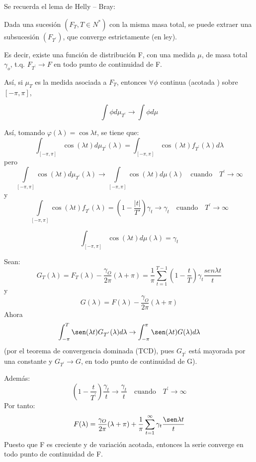 Se recuerda el lema de Helly -- Bray:\newline

Dada una sucesi\'{o}n $\left( {F_{T} ,T\in N^{\ast }} \right)$ con la misma masa total, se puede extraer una subsucesi\'{o}n $\left( F_{T^{'}} \right)$, que converge estrictamente (en ley).\newline

Es decir, existe una funci\'{o}n de distribuci\'{o}n F, con una medida $\mu $, de masa total $\gamma_{o}$, t.q. $F_{T^{'}} \to F$ en todo punto de continuidad de F.\newline

As\'{i}, si $\mu_{T}$ es la medida asociada a $F_{T}$, entonces $\forall \phi$ continua (acotada ) sobre $\left[ {-\pi ,\pi } \right]$, 

\[\int \phi d\mu_{T^{'}} \to \int \phi d\mu \]

As\'{i}, tomando $\varphi \left( \lambda \right)=\cos \lambda t$, se tiene que:
\[
\int_{\left[-\pi,\pi \right]} \cos (\lambda t) d\mu_{T^{'}} (\lambda)= \int_{\left[-\pi, \pi\right]} \cos (\lambda t) f_{T^{'}} (\lambda ) d\lambda 
\]
pero 
\[\int\limits_{\left[ {-\pi ,\pi } \right]} \cos (\lambda t) d\mu_{T^{'}} (\lambda)\to \int\limits_{\left[-\pi, \pi \right]} \cos (\lambda t) d\mu (\lambda)\quad \text{cuando}\quad T^{'}\to \infty \]
y
\[\int\limits_{\left[-\pi, \pi \right]} \cos (\lambda t) f_{T^{'}} (\lambda)=\left( 1-\frac{|t|}{T'} \right)\gamma_{t} \to \gamma_{t}\quad \text{cuando}\quad T^{'}\to \infty \]

\[
\int_{\left[-\pi, \pi \right]} \cos (\lambda t) d\mu (\lambda)=\gamma_{t} 
\]

Sean: 
\[
G_{T}(\lambda)=F_{T} (\lambda )-\frac{\gamma_{O}}{2\pi}(\lambda +\pi)=\frac{1}{\pi}\sum\limits_{t=1}^{T-1} 
\left(1-\frac{t}{T}\right) \gamma_{t}\frac{sen\lambda t}{t}
\] 
y
\[
G(\lambda)=F(\lambda)-\frac{\gamma_{O}}{2\pi}(\lambda +\pi)
\]
Ahora
\[
\int_{-\pi}^{T} \sen (\lambda t) G_{T^{'}} (\lambda) d\lambda \to \int_{-\pi}^{\pi} \sen (\lambda t) G(\lambda) d\lambda
\]
(por el teorema de convergencia dominada (TCD), pues $G_{T^{'}}$ est\'{a} mayorada por una constante y $G_{T^{'}} \to G$, en todo punto de continuidad de G).\newline

Además:
\[
\left(1-\frac{t}{T^{'}} \right)\frac{\gamma_{t}}{t}\to \frac{\gamma_{t}}{t}\quad \text{cuando}\quad T^{'}\to \infty
\]
Por tanto:
\[
F(\lambda)=\frac{\gamma_{O}}{2\pi}(\lambda +\pi) + \frac{1}{\pi}\sum_{t=1}^{\infty} \gamma_{t} \frac{\sen \lambda t}{t}
\]
Puesto que F es creciente y de variaci\'{o}n acotada, entonces la serie converge en todo punto de continuidad de F.\newline

